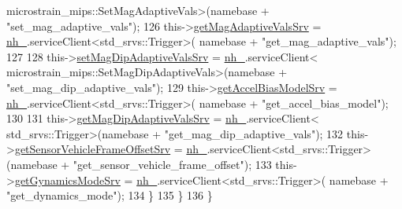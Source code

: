 \begin{DoxyCode}
      microstrain\_mips::SetMagAdaptiveVals>(namebase + \textcolor{stringliteral}{"set\_mag\_adaptive\_vals"});
126                 this->\hyperlink{classcl__microstrain__mips_1_1ClMicrostainMips_a799d76ddd2e92c3624d51ffb7c4b8c89}{getMagAdaptiveValsSrv} = \hyperlink{classcl__microstrain__mips_1_1ClMicrostainMips_a5a39ba0864ba2c4c003b6ea427538243}{nh\_}.serviceClient<std\_srvs::Trigger>(
      namebase + \textcolor{stringliteral}{"get\_mag\_adaptive\_vals"});
127 
128                 this->\hyperlink{classcl__microstrain__mips_1_1ClMicrostainMips_a3618b27ce1ed75f2e498c0bc6a36599d}{setMagDipAdaptiveValsSrv} = \hyperlink{classcl__microstrain__mips_1_1ClMicrostainMips_a5a39ba0864ba2c4c003b6ea427538243}{nh\_}.serviceClient<
      microstrain\_mips::SetMagDipAdaptiveVals>(namebase + \textcolor{stringliteral}{"set\_mag\_dip\_adaptive\_vals"});
129                 this->\hyperlink{classcl__microstrain__mips_1_1ClMicrostainMips_a5516ee2ad71621f728245d0854104dc7}{getAccelBiasModelSrv} = \hyperlink{classcl__microstrain__mips_1_1ClMicrostainMips_a5a39ba0864ba2c4c003b6ea427538243}{nh\_}.serviceClient<std\_srvs::Trigger>(
      namebase + \textcolor{stringliteral}{"get\_accel\_bias\_model"});
130 
131                 this->\hyperlink{classcl__microstrain__mips_1_1ClMicrostainMips_aa5a412d1343febccf6bda432eacb0581}{getMagDipAdaptiveValsSrv} = \hyperlink{classcl__microstrain__mips_1_1ClMicrostainMips_a5a39ba0864ba2c4c003b6ea427538243}{nh\_}.serviceClient<
      std\_srvs::Trigger>(namebase + \textcolor{stringliteral}{"get\_mag\_dip\_adaptive\_vals"});
132                 this->\hyperlink{classcl__microstrain__mips_1_1ClMicrostainMips_a12957749416c955e1b0132cb2213f879}{getSensorVehicleFrameOffsetSrv} = 
      \hyperlink{classcl__microstrain__mips_1_1ClMicrostainMips_a5a39ba0864ba2c4c003b6ea427538243}{nh\_}.serviceClient<std\_srvs::Trigger>(namebase + \textcolor{stringliteral}{"get\_sensor\_vehicle\_frame\_offset"});
133                 this->\hyperlink{classcl__microstrain__mips_1_1ClMicrostainMips_a5ded1b1b3506d16e56d312b3d1a7fe13}{getGynamicsModeSrv} = \hyperlink{classcl__microstrain__mips_1_1ClMicrostainMips_a5a39ba0864ba2c4c003b6ea427538243}{nh\_}.serviceClient<std\_srvs::Trigger>(
      namebase + \textcolor{stringliteral}{"get\_dynamics\_mode"});
134             \}
135         \}
136     \}
\end{DoxyCode}

